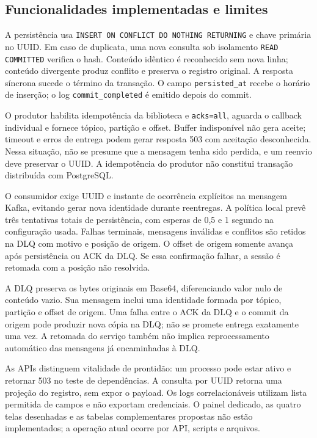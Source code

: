 \subsection{Funcionalidades implementadas e limites}
A persistência usa \texttt{INSERT ON CONFLICT DO NOTHING RETURNING} e chave primária no UUID. Em caso de duplicata, uma nova consulta sob isolamento \texttt{READ COMMITTED} verifica o hash. Conteúdo idêntico é reconhecido sem nova linha; conteúdo divergente produz conflito e preserva o registro original. A resposta síncrona sucede o término da transação. O campo \texttt{persisted\_at} recebe o horário de inserção; o log \texttt{commit\_completed} é emitido depois do commit.

O produtor habilita idempotência da biblioteca e \texttt{acks=all}, aguarda o callback individual e fornece tópico, partição e offset. Buffer indisponível não gera aceite; timeout e erros de entrega podem gerar resposta 503 com aceitação desconhecida. Nessa situação, não se presume que a mensagem tenha sido perdida, e um reenvio deve preservar o UUID. A idempotência do produtor não constitui transação distribuída com PostgreSQL.

O consumidor exige UUID e instante de ocorrência explícitos na mensagem Kafka, evitando gerar nova identidade durante reentregas. A política local prevê três tentativas totais de persistência, com esperas de 0,5 e 1 segundo na configuração usada. Falhas terminais, mensagens inválidas e conflitos são retidos na DLQ com motivo e posição de origem. O offset de origem somente avança após persistência ou ACK da DLQ. Se essa confirmação falhar, a sessão é retomada com a posição não resolvida.

A DLQ preserva os bytes originais em Base64, diferenciando valor nulo de conteúdo vazio. Sua mensagem inclui uma identidade formada por tópico, partição e offset de origem. Uma falha entre o ACK da DLQ e o commit da origem pode produzir nova cópia na DLQ; não se promete entrega exatamente uma vez. A retomada do serviço também não implica reprocessamento automático das mensagens já encaminhadas à DLQ.

As APIs distinguem vitalidade de prontidão: um processo pode estar ativo e retornar 503 no teste de dependências. A consulta por UUID retorna uma projeção do registro, sem expor o payload. Os logs correlacionáveis utilizam lista permitida de campos e não exportam credenciais. O painel dedicado, as quatro telas desenhadas e as tabelas complementares propostas não estão implementados; a operação atual ocorre por API, scripts e arquivos.

